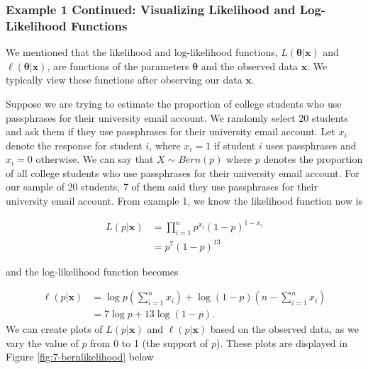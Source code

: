 \documentclass[
]{book}
\begin{document}
\hypertarget{example-1-continued-visualizing-likelihood-and-log-likelihood-functions}{%
\subsubsection{Example 1 Continued: Visualizing Likelihood and Log-Likelihood Functions}\label{example-1-continued-visualizing-likelihood-and-log-likelihood-functions}}

We mentioned that the likelihood and log-likelihood functions, \(L(\boldsymbol{\theta} | \boldsymbol{x} )\) and \(\ell(\boldsymbol{\theta} | \boldsymbol{x} )\), are functions of the parameters \(\boldsymbol{\theta}\) and the observed data \(\boldsymbol{x}\). We typically view these functions after observing our data \(\boldsymbol{x}\).

Suppose we are trying to estimate the proportion of college students who use passphrases for their university email account. We randomly select 20 students and ask them if they use passphrases for their university email account. Let \(x_i\) denote the response for student \(i\), where \(x_i = 1\) if student \(i\) uses passphrases and \(x_i=0\) otherwise. We can say that \(X \sim Bern(p)\) where \(p\) denotes the proportion of all college students who use passphrases for their university email account. For our sample of 20 students, 7 of them said they use passphrases for their university email account. From example 1, we know the likelihood function now is

\[
\begin{split}
L(p | \boldsymbol{x} ) &= \prod_{i=1}^n p^{x_i} (1-p)^{1-x_i} \\
                       &= p^7 (1-p)^{13}
\end{split}
\]

and the log-likelihood function becomes

\[
\begin{split}
\ell (p | \boldsymbol{x}) &= \log p \left(\sum_{i=1}^n x_i \right) + \log (1-p) \left( n - \sum_{i=1}^n x_i \right)\\
                          &= 7 \log p + 13 \log(1-p).
\end{split}
\]
We can create plots of \(L(p | \boldsymbol{x} )\) and \(\ell(p | \boldsymbol{x} )\) based on the observed data, as we vary the value of \(p\) from 0 to 1 (the support of \(p\)). These plots are displayed in Figure \ref{fig:7-bernlikelihood} below
\end{document}
